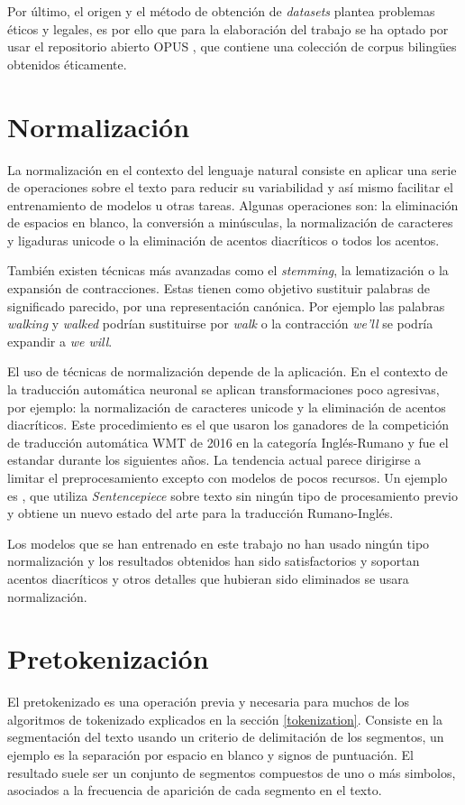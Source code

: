 Por último, el origen y el método de obtención de \textit{datasets} plantea problemas éticos y legales, es por ello que para la elaboración del trabajo se ha optado por usar el repositorio abierto OPUS \cite{CORPUS}, que contiene una colección de corpus biling{\"u}es obtenidos éticamente.

\section{Normalización}
La normalización en el contexto del lenguaje natural consiste en aplicar una serie de operaciones sobre el texto para reducir su variabilidad y así mismo facilitar el entrenamiento de modelos u otras tareas. Algunas operaciones son: la eliminación de espacios en blanco, la conversión a minúsculas, la normalización de caracteres y ligaduras unicode o la eliminación de acentos diacríticos o todos los acentos.

También existen técnicas más avanzadas como el \textit{stemming}, la lematización o la expansión de contracciones. Estas tienen como objetivo sustituir palabras de significado parecido, por una representación canónica. Por ejemplo las palabras \textit{walking} y \textit{walked} podrían sustituirse por \textit{walk} o la contracción \textit{we'll} se podría expandir a \textit{we will}.

El uso de técnicas de normalización depende de la aplicación. En el contexto de la traducción automática neuronal se aplican transformaciones poco agresivas, por ejemplo: la normalización de caracteres unicode y la eliminación de acentos diacríticos.
Este procedimiento es el que usaron los ganadores de la competición de traducción automática WMT de 2016 en la categoría Inglés-Rumano \cite{Sennrich2016Jun} y fue el estandar durante los siguientes años. La tendencia actual parece dirigirse a limitar el preprocesamiento excepto con modelos de pocos recursos. Un ejemplo es \cite{Liu2020Jan}, que utiliza \textit{Sentencepiece} sobre texto sin ningún tipo de procesamiento previo y obtiene un nuevo estado del arte para la traducción Rumano-Inglés.

Los modelos que se han entrenado en este trabajo no han usado ningún tipo normalización y los resultados obtenidos han sido satisfactorios y soportan acentos diacríticos y otros detalles que hubieran sido eliminados se usara normalización.

\section{Pretokenización}
El pretokenizado es una operación previa y necesaria para muchos de los algoritmos de tokenizado explicados en la sección \ref{tokenization}. Consiste en la segmentación del texto usando un criterio de delimitación de los segmentos, un ejemplo es la separación por espacio en blanco y signos de puntuación.
El resultado suele ser un conjunto de segmentos compuestos de uno o más simbolos, asociados a la frecuencia de aparición de cada segmento en el texto. 

